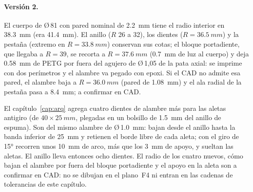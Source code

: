\paragraph{Versión 2.} El cuerpo de Ø\,81 con pared nominal de \SI{2.2}{mm} tiene el radio interior en
\SI{38.3}{mm} (era \SI{41.4}{mm}). El anillo ($R$ 26 a 32), los dientes ($R=\SI{36.5}{mm}$) y la pestaña
(extremo en $R=\SI{33.8}{mm}$) conservan sus cotas; el bloque portadiente, que llegaba a $R=39$, se recorta a
$R=\SI{37.6}{mm}$ (\SI{0.7}{mm} de luz al cuerpo) y deja \SI{0.58}{mm} de PETG por fuera del agujero de Ø\,1,05
de la pata axial: se imprime con dos perímetros y el alambre va pegado con epoxi. Si el CAD no admite esa pared,
el alambre baja a $R=\SI{36.0}{mm}$ (pared de \SI{1.08}{mm}) y el ala radial de la pestaña pasa a
\SI{8.4}{mm}; a confirmar en CAD.

El capítulo~\ref{cap:arq} agrega cuatro dientes de alambre más para las aletas antigiro (de
$40\times\SI{25}{mm}$, plegadas en un bolsillo de \SI{1.5}{mm} del anillo de espuma). Son del mismo alambre de
Ø\,\SI{1.0}{mm}: bajan desde el anillo hasta la banda inferior de \SI{25}{mm} y retienen el borde libre de
cada aleta; con el giro de \ang{15} recorren unos \SI{10}{mm} de arco, más que los \SI{3}{mm} de apoyo, y
sueltan las aletas. El anillo lleva entonces ocho dientes. El radio de los cuatro nuevos, cómo bajan el alambre
por fuera del bloque portadiente y el apoyo en la aleta son a confirmar en CAD: no se dibujan en el
plano~F4 ni entran en las cadenas de tolerancias de este capítulo.


